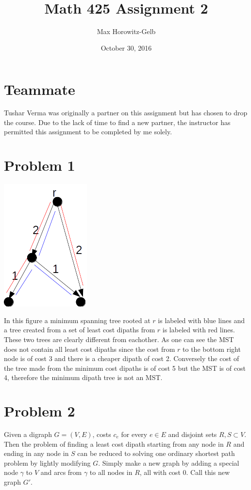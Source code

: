 \documentclass{article}
\title{Math 425 Assignment 2}
\author{Max Horowitz-Gelb}
\date{October 30, 2016}
\begin{document}
\maketitle
\section*{Teammate}
Tushar Verma was originally a partner on this assignment
but has chosen to drop the course. Due to the lack of time
to find a new partner, the instructor has permitted this assignment to be completed by me solely.

\section*{Problem 1}
\includegraphics[scale=0.5]{tree}

In this figure a minimum spanning tree rooted at $r$ is labeled with blue lines and a tree created from a set of least cost dipaths from $r$ is labeled with red lines. These two trees are clearly different from eachother. As one can see the MST does not contain all least cost dipaths since the cost from $r$ to the bottom right node is of cost 3 and there is a cheaper dipath of cost 2. Conversely the cost of the tree made from the minimum cost dipaths is of cost 5 but the MST is of cost 4, therefore the minimum dipath tree is not an MST.
\section*{Problem 2}
Given a digraph $G = (V,E)$, costs $c_e$ for every $e \in E$ and disjoint sets $R,S \subset V$. Then the problem of finding a least cost dipath starting from any node in $R$ and ending in any node in $S$ can be reduced to solving one ordinary shortest path problem by lightly modifying $G$. Simply make a new graph by adding a special node $\gamma$ to $V$ and arcs from $\gamma$ to all nodes in $R$, all with cost $0$. Call this new graph  $G'$.
\end{document}
